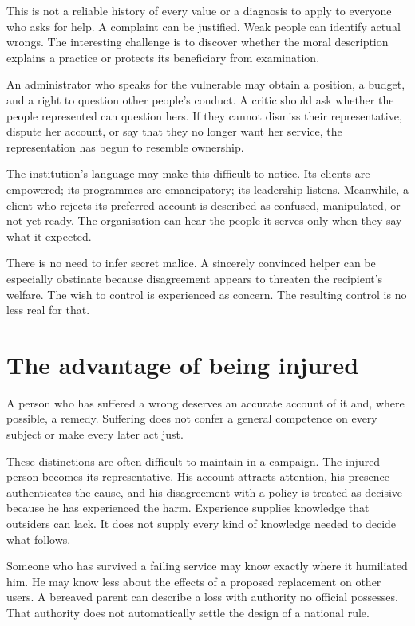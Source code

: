 \documentclass[12pt,a4paper]{book}
\begin{document}
This is not a reliable history of every value or a diagnosis to apply to everyone who asks for help. A complaint can be justified. Weak people can identify actual wrongs. The interesting challenge is to discover whether the moral description explains a practice or protects its beneficiary from examination.

An administrator who speaks for the vulnerable may obtain a position, a budget, and a right to question other people's conduct. A critic should ask whether the people represented can question hers. If they cannot dismiss their representative, dispute her account, or say that they no longer want her service, the representation has begun to resemble ownership.

The institution's language may make this difficult to notice. Its clients are empowered; its programmes are emancipatory; its leadership listens. Meanwhile, a client who rejects its preferred account is described as confused, manipulated, or not yet ready. The organisation can hear the people it serves only when they say what it expected.

There is no need to infer secret malice. A sincerely convinced helper can be especially obstinate because disagreement appears to threaten the recipient's welfare. The wish to control is experienced as concern. The resulting control is no less real for that.

\section*{The advantage of being injured}

A person who has suffered a wrong deserves an accurate account of it and, where possible, a remedy. Suffering does not confer a general competence on every subject or make every later act just.

These distinctions are often difficult to maintain in a campaign. The injured person becomes its representative. His account attracts attention, his presence authenticates the cause, and his disagreement with a policy is treated as decisive because he has experienced the harm. Experience supplies knowledge that outsiders can lack. It does not supply every kind of knowledge needed to decide what follows.

Someone who has survived a failing service may know exactly where it humiliated him. He may know less about the effects of a proposed replacement on other users. A bereaved parent can describe a loss with authority no official possesses. That authority does not automatically settle the design of a national rule.
\end{document}
